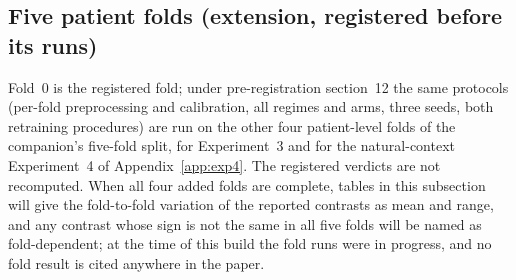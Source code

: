 \subsection{Five patient folds (extension, registered before its runs)}
Fold~0 is the registered fold; under pre-registration section~12 the same protocols
(per-fold preprocessing and calibration, all regimes and arms, three seeds, both
retraining procedures) are run on the other four patient-level folds of the
companion's five-fold split, for Experiment~3 and for the natural-context
Experiment~4 of Appendix~\ref{app:exp4}. The registered verdicts are not recomputed.
When all four added folds are complete, tables in this subsection will give the
fold-to-fold variation of the reported contrasts as mean and range, and any contrast
whose sign is not the same in all five folds will be named as fold-dependent; at the
time of this build the fold runs were in progress, and no fold result is cited
anywhere in the paper.
